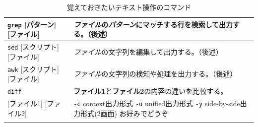 \documentclass[a4j]{ltjsreport}
\begin{document}
\begin{longtable}[c]{|p{3.5cm}|p{13.5cm}|}
        \texttt{grep} {\footnotesize [パターン] [ファイル]}  &\emph{ファイル}の\emph{パターン}にマッチする行を検索して出力する。（後述）\\
        \hline
        \texttt{sed} {\footnotesize [スクリプト] [ファイル]}   &\emph{ファイル}の文字列を編集して出力する。（後述）\\
        \hline
        \texttt{awk} {\footnotesize [スクリプト] [ファイル]} &\emph{ファイル}の文字列の検知や処理を出力する。（後述）\\
        \hline

        \texttt{diff}&\textbf{ファイル1}と\textbf{ファイル2}の内容の違いを比較する。\\
        {\small [ファイル1] [ファイル2]} &\texttt{-c} context出力形式 \texttt{-u} unified出力形式 \texttt{-y} side-by-side出力形式(2画面) お好みでどうぞ\\
        \hline
        \caption{覚えておきたいテキスト操作のコマンド}
    \end{longtable}
\end{document}
